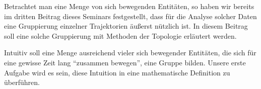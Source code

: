 Betrachtet man eine Menge von sich bewegenden Entitäten, so haben wir bereits im dritten Beitrag dieses Seminars festgestellt, dass für die Analyse solcher Daten eine Gruppierung einzelner Trajektorien äußerst nützlich ist.
In diesem Beitrag soll eine solche Gruppierung mit Methoden der Topologie erläutert werden.

Intuitiv soll eine Menge ausreichend vieler sich bewegender Entitäten, die sich für eine gewisse Zeit lang \enquote{zusammen bewegen}, eine Gruppe bilden.
Unsere erste Aufgabe wird es sein, diese Intuition in eine mathematische Definition zu überführen.


